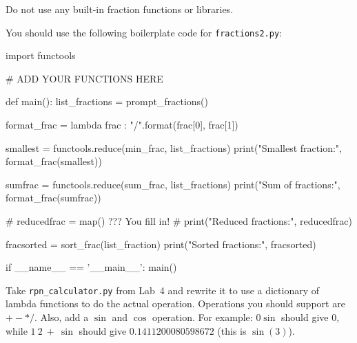 \documentclass[11pt]{cselabheader}
\begin{document}
\begin{ex}[fractions2.py]
    Do not use any built-in fraction functions or libraries.

    You should use the following boilerplate code for \texttt{fractions2.py}:
    \begin{python3code}
import functools

# ADD YOUR FUNCTIONS HERE

def main():
  list_fractions = prompt_fractions()

  format_frac = lambda frac : "{}/{}".format(frac[0], frac[1])

  smallest = functools.reduce(min_frac, list_fractions)
  print("Smallest fraction:", format_frac(smallest))

  sumfrac = functools.reduce(sum_frac, list_fractions)
  print("Sum of fractions:", format_frac(sumfrac))

  # reducedfrac = map() ??? You fill in!
  # print("Reduced fractions:", reducedfrac)

  fracsorted = sort_frac(list_fraction)
  print("Sorted fractions:", fracsorted)

if __name__ == '__main__':
  main()
    \end{python3code}
  \end{ex}

  \begin{ex}[rpn.py] Take \texttt{rpn\_calculator.py} from Lab~4 and rewrite
    it to use a dictionary of lambda functions to do the actual operation.
    Operations you should support are $+ - * /$. Also, add a $\sin$ and $\cos$
    operation. For example: $0 \sin$ should give $0$, while $1~2~+~\sin$ should
    give $0.1411200080598672$ (this is $\sin(3)$).
  \end{ex}

%
%
%
%
%
\end{document}
